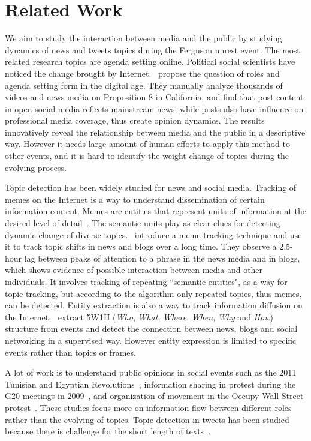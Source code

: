 \section{Related Work}
\label{sec:related_work}

We aim to study the interaction between media and the public by studying dynamics of news and tweets topics during the Ferguson unrest event. The most related research topics are agenda setting online. Political social scientists have noticed the change brought by Internet.~ propose the question of roles and agenda setting form in the digital age. They manually analyze thousands of videos and news media on Proposition 8 in California, and find that post content in open social media reflects mainstream news, while posts also have influence on professional media coverage, thus create opinion dynamics. The results innovatively reveal the relationship between media and the public in a descriptive way. However it needs large amount of human efforts to apply this method to other events, and it is hard to identify the weight change of topics during the evolving process.

Topic detection has been widely studied for news and social media.
Tracking of memes on the Internet is a way to understand dissemination of certain information content.
Memes are entities that represent units of information at the desired level of detail~\cite{ratkiewicz2010detecting}.
The semantic units play as clear clues for detecting dynamic change of diverse topics.~ introduce a meme-tracking technique and use it to track topic shifts in news and blogs over a long time.
They observe a 2.5-hour lag between peaks of attention to a phrase in the news media and in blogs, which shows evidence of possible interaction between media and other individuals.
It involves tracking of repeating ``semantic entities", as a way for topic tracking, but according to the algorithm only repeated topics, thus memes, can be detected.
Entity extraction is also a way to track information diffusion on the Internet.~ extract 5W1H (\emph{Who}, \emph{What}, \emph{Where}, \emph{When}, \emph{Why} and \emph{How}) structure from events and detect the connection between news, blogs and social networking in a supervised way.
However entity expression is limited to specific events rather than topics or frames.

A lot of work is to understand public opinions in social events such as the 2011 Tunisian and Egyptian Revolutions~\cite{gonzalez2011dynamics}, information sharing in protest during the G20 meetings in 2009~\cite{earl2013protest}, and organization of movement in the Occupy Wall Street protest~\cite{conover2013geospatial}.
These studies focus more on information flow between different roles rather than the evolving of topics.
Topic detection in tweets has been studied because there is challenge for the short length of texts~\cite{yan2013biterm,zhao2011comparing}.

